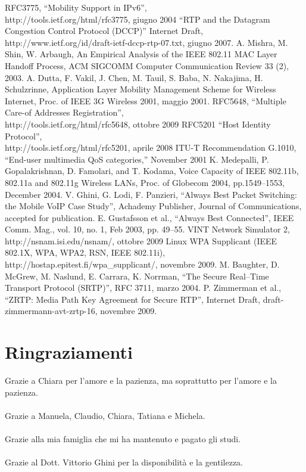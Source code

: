 \documentclass[12pt,a4paper,openright,twoside]{book}
\begin{document}
\begin{thebibliography}{90}
\rhead[\fancyplain{}{\bfseries \leftmark}]{\fancyplain{}{\bfseries
\thepage}}
 RFC3775, ``Mobility Support in IPv6'',\\
  http://tools.ietf.org/html/rfc3775, giugno 2004
 ``RTP and the Datagram Congestion Control Protocol
  (DCCP)'' Internet Draft,
  http://www.ietf.org/id/draft-ietf-dccp-rtp-07.txt, giugno 2007.
 A. Mishra, M. Shin, W. Arbaugh, An
  Empirical Analysis of the IEEE 802.11 MAC Layer Handoff Process, ACM
  SIGCOMM Computer Communication Review 33 (2), 2003.
 A. Dutta, F. Vakil, J. Chen,
  M. Tauil, S. Baba, N. Nakajima, H.  Schulzrinne, Application Layer
  Mobility Management Scheme for Wireless Internet, Proc. of IEEE 3G
  Wireless 2001, maggio 2001.
 RFC5648, ``Multiple Care-of Addresses
  Registration'',\\http://tools.ietf.org/html/rfc5648, ottobre 2009
 RFC5201 ``Host Identity Protocol'',\\
  http://tools.ietf.org/html/rfc5201, aprile 2008
 ITU-T Recommendation G.1010, “End-user multimedia
  QoS categories,” November 2001
 K. Medepalli, P. Gopalakrishnan, D. Famolari,
  and T. Kodama, Voice Capacity of IEEE 802.11b, 802.11a and 802.11g
  Wireless LANs, Proc. of Globecom 2004, pp.1549–1553, December 2004.
 V. Ghini, G. Lodi, F. Panzieri, ``Always Best
  Packet Switching: the Mobile VoIP Case Study'', Achademy Publisher,
  Journal of Communications, accepted for publication.
 E. Gustafsson et al., ``Always Best Connected'',
  IEEE Comm. Mag., vol. 10, no. 1, Feb 2003, pp. 49--55.
 VINT Network Simulator 2,
  http://nsnam.isi.edu/nsnam/, ottobre 2009
 Linux WPA Supplicant (IEEE 802.1X, WPA,
  WPA2, RSN, IEEE 802.11i), http://hostap.epitest.fi/wpa\_supplicant/,
  novembre 2009.
 M. Baughter, D. McGrew, M. Naslund, E. Carrara,
  K. Norrman, ``The Secure Real--Time Transport Protocol (SRTP)'', RFC
  3711, marzo 2004.
 P. Zimmerman et al., ``ZRTP: Media Path Key
  Agreement for Secure RTP'', Internet Draft,
  draft-zimmermann-avt-zrtp-16, novembre 2009.
\end{thebibliography}

\clearpage{\pagestyle{empty}\cleardoublepage}

\chapter*{Ringraziamenti}
\thispagestyle{empty}

\noindent Grazie a Chiara per l'amore e la pazienza, ma soprattutto
per l'amore e la pazienza.\\\\Grazie a Manuela, Claudio, Chiara,
Tatiana e Michela.\\\\Grazie alla mia famiglia che mi ha mantenuto e
pagato gli studi.\\\\Grazie al Dott. Vittorio Ghini per la
disponibilità e la gentilezza.
\end{document}
